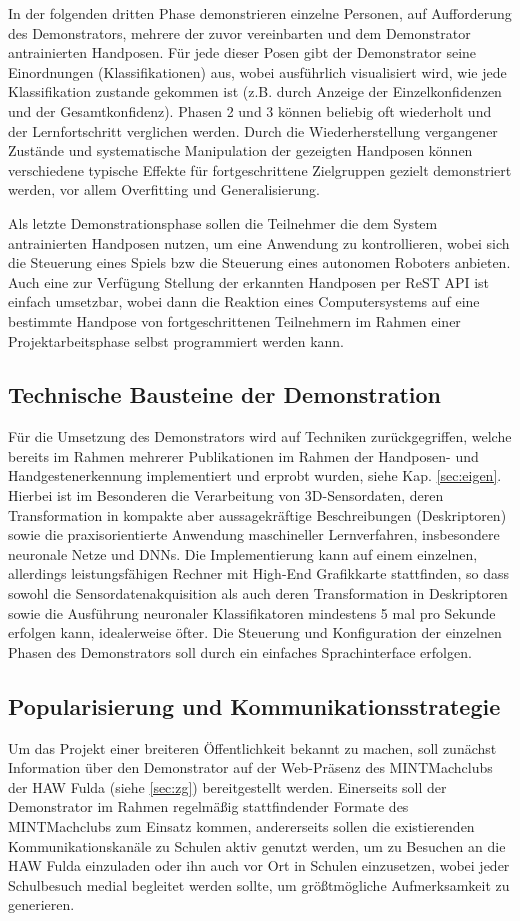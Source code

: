 \documentclass[11pt]{article}
\begin{document}
In der folgenden dritten Phase demonstrieren einzelne Personen, auf Aufforderung des Demonstrators, mehrere der zuvor vereinbarten und dem Demonstrator antrainierten Handposen. Für jede dieser Posen gibt der Demonstrator seine Einordnungen (Klassifikationen) aus, wobei
ausführlich visualisiert wird, wie jede Klassifikation zustande gekommen ist (z.B. durch Anzeige der Einzelkonfidenzen und der Gesamtkonfidenz). Phasen 2 und 3 können beliebig oft wiederholt und der Lernfortschritt verglichen werden. Durch die Wiederherstellung vergangener Zustände und systematische Manipulation der gezeigten Handposen können verschiedene typische Effekte für fortgeschrittene Zielgruppen gezielt demonstriert werden, vor allem Overfitting und Generalisierung.

Als letzte Demonstrationsphase sollen die Teilnehmer die dem System antrainierten Handposen nutzen, um eine Anwendung zu kontrollieren, wobei sich
die Steuerung eines Spiels bzw die Steuerung eines autonomen Roboters anbieten. Auch eine zur Verfügung Stellung der erkannten Handposen per ReST API ist einfach umsetzbar,
wobei dann die Reaktion eines Computersystems auf eine bestimmte Handpose von fortgeschrittenen Teilnehmern im Rahmen einer Projektarbeitsphase selbst programmiert werden kann.
%
\subsection{Technische Bausteine der Demonstration}
%
Für die Umsetzung des Demonstrators wird auf Techniken zurückgegriffen, welche bereits im Rahmen mehrerer Publikationen im Rahmen der Handposen- und Handgestenerkennung implementiert und erprobt wurden, siehe Kap. \ref{sec:eigen}. Hierbei ist im Besonderen die Verarbeitung von 3D-Sensordaten, deren Transformation in kompakte aber aussagekräftige Beschreibungen (Deskriptoren) sowie die praxisorientierte Anwendung maschineller Lernverfahren, insbesondere neuronale Netze und DNNs. Die Implementierung kann auf einem einzelnen, allerdings leistungsfähigen Rechner mit High-End Grafikkarte stattfinden, so dass sowohl die Sensordatenakquisition als auch deren Transformation in Deskriptoren sowie die Ausführung neuronaler Klassifikatoren mindestens 5 mal pro Sekunde erfolgen kann, idealerweise öfter. Die Steuerung und Konfiguration der einzelnen Phasen des Demonstrators soll durch ein einfaches Sprachinterface erfolgen.
%
\subsection{Popularisierung und Kommunikationsstrategie}
Um das Projekt einer breiteren Öffentlichkeit bekannt zu machen, soll zunächst Information über den Demonstrator auf der Web-Präsenz des MINTMachclubs der HAW Fulda (siehe \ref{sec:zg}) bereitgestellt werden. Einerseits soll der Demonstrator im Rahmen regelmäßig stattfindender Formate des MINTMachclubs zum Einsatz kommen, andererseits sollen die existierenden Kommunikationskanäle zu Schulen aktiv genutzt werden, um zu Besuchen an die HAW Fulda einzuladen oder ihn auch vor Ort in Schulen einzusetzen, wobei jeder Schulbesuch medial begleitet werden sollte, um größtmögliche Aufmerksamkeit zu generieren.
%
\renewcommand{\thesection}{3}
\end{document}
